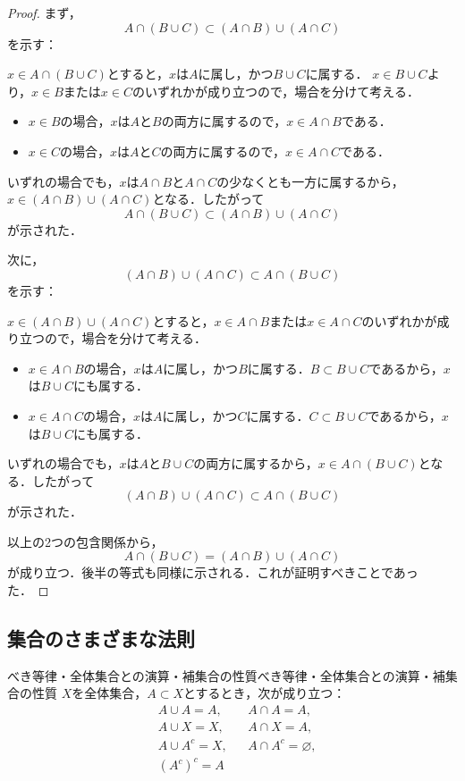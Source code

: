 \begin{tleftbar}
  \begin{proof}
    まず，
    \[
      A \cap (B \cup C) \subset (A \cap B) \cup (A \cap C)
    \]
    を示す：

    $x \in A \cap (B \cup C)$とすると，$x$は$A$に属し，かつ$B \cup C$に属する．
    $x \in B \cup C$より，$x \in B$または$x \in C$のいずれかが成り立つので，場合を分けて考える．
    \begin{itemize}
      \item $x \in B$の場合，$x$は$A$と$B$の両方に属するので，$x \in A \cap B$である．
      \item $x \in C$の場合，$x$は$A$と$C$の両方に属するので，$x \in A \cap C$である．
    \end{itemize}
    いずれの場合でも，$x$は$A \cap B$と$A \cap C$の少なくとも一方に属するから，$x \in (A \cap B) \cup (A \cap C)$となる．したがって
    \[
      A \cap (B \cup C) \subset (A \cap B) \cup (A \cap C)
    \]
    が示された．

    次に，
    \[
      (A \cap B) \cup (A \cap C) \subset A \cap (B \cup C)
    \]
    を示す：

    $x \in (A \cap B) \cup (A \cap C)$とすると，$x \in A \cap B$または$x \in A \cap C$のいずれかが成り立つので，場合を分けて考える．
    \begin{itemize}
      \item $x \in A \cap B$の場合，$x$は$A$に属し，かつ$B$に属する．$B \subset B \cup C$であるから，$x$は$B \cup C$にも属する．
      \item $x \in A \cap C$の場合，$x$は$A$に属し，かつ$C$に属する．$C \subset B \cup C$であるから，$x$は$B \cup C$にも属する．
    \end{itemize}
    いずれの場合でも，$x$は$A$と$B \cup C$の両方に属するから，$x \in A \cap (B \cup C)$となる．したがって
    \[
      (A \cap B) \cup (A \cap C) \subset A \cap (B \cup C)
    \]
    が示された．

    以上の2つの包含関係から，
    \[
      A \cap (B \cup C) =(A \cap B) \cup (A \cap C)
    \]
    が成り立つ．後半の等式も同様に示される．これが証明すべきことであった．
  \end{proof}
\end{tleftbar}

\subsection{集合のさまざまな法則}

\begin{prop}{べき等律・全体集合との演算・補集合の性質}{べき等律・全体集合との演算・補集合の性質}
  $X$を全体集合，$A \subset X$とするとき，次が成り立つ：
  \begin{align*}
    & A \cup A = A, && A \cap A = A, \\
    & A \cup X = X, && A \cap X = A, \\
    & A \cup A^c = X, && A \cap A^c = \varnothing, \\
    & (A^c)^c = A
  \end{align*}
\end{prop}

